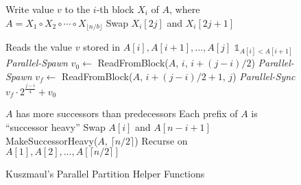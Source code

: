 \documentclass[sigplan, 10pt, nonacm]{acmart}
\theoremstyle{remark}
\theoremstyle{remark}
\begin{document}
\begin{figure*}
  \caption{Kuszmaul's Parallel Partition Helper Functions}
	\label{alg:parallelPartition}
  \begin{algorithmic} %
     \Comment Write value $v$ to the $i$-th block $X_i$ of $A$, where $A = X_1 \circ X_2 \circ \cdots \circ X_{\lfloor n/b \rfloor}$
          \State Swap $X_i[2j]$ and $X_i[2j+1]$
        \EndIf
      \EndFor
    \EndProcedure
    \State

     \Comment Reads the value $v$ stored in $A[i], A[i+1], \ldots, A[j]$
        \State \Return $\mathds{1}_{A[i] < A[i+1]}$
      \Else
        \State \emph{Parallel-Spawn} $v_0 \gets $ ReadFromBlock($A$, $i$, $i+(j-i)/2$)
        \State \emph{Parallel-Spawn} $v_f \gets $ ReadFromBlock($A$, $i+(j-i)/2+1$, $j$)
        \State \emph{Parallel-Sync}
        \State \Return $v_f\cdot 2^\frac{j-i}{4} + v_0$
      \EndIf
    \EndProcedure
    \State

    \Require $A$ has more successors than predecessors
    \Ensure Each prefix of $A$ is ``successor heavy''
          \State Swap $A[i]$ and $A[n-i+1]$
        \EndIf
      \EndFor
      \State MakeSuccessorHeavy($A$, $\lceil n/2 \rceil$)
      \Comment Recurse on $A[1],A[2], \ldots, A[\lceil n/2 \rceil]$
    \EndProcedure
	\end{algorithmic}	
\end{figure*}
\end{document}
